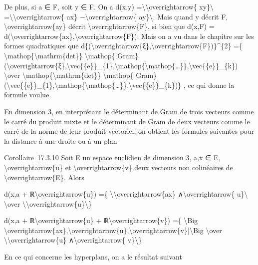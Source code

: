 \documentclass[]{article}
\begin{document}
De plus, si a ∈ F, soit y ∈ F. On a d(x,y)
=\textbackslash{}\textbar{}\textbackslash{}overrightarrow\{
xy\}\textbackslash{}\textbar{}
=\textbackslash{}\textbar{}\textbackslash{}overrightarrow\{ ax\}
−\textbackslash{}overrightarrow\{ ay\}\textbackslash{}\textbar{}. Mais
quand y décrit F, \textbackslash{}overrightarrow\{ay\} décrit
\textbackslash{}overrightarrow\{F\}, si bien que d(x,F) =
d(\textbackslash{}overrightarrow\{ax\},\textbackslash{}overrightarrow\{F\}).
Mais on a vu dans le chapitre sur les formes quadratiques que
d\{(\textbackslash{}overrightarrow\{ξ\},\textbackslash{}overrightarrow\{F\})\}\^{}\{2\}
=\{ \textbackslash{}mathop\{\textbackslash{}mathrm\{det\}\}
\textbackslash{}mathop\{
Gram\}(\textbackslash{}overrightarrow\{ξ\},\textbackslash{}vec\{\{e\}\}\_\{1\},\textbackslash{}mathop\{\textbackslash{}mathop\{\ldots{}\}\},\textbackslash{}vec\{\{e\}\}\_\{k\})
\textbackslash{}over
\textbackslash{}mathop\{\textbackslash{}mathrm\{det\}\}
\textbackslash{}mathop\{
Gram\}(\textbackslash{}vec\{\{e\}\}\_\{1\},\textbackslash{}mathop\{\textbackslash{}mathop\{\ldots{}\}\},\textbackslash{}vec\{\{e\}\}\_\{k\})\}
, ce qui donne la formule voulue.

En dimension 3, en interprétant le déterminant de Gram de trois vecteurs
comme le carré du produit mixte et le déterminant de Gram de deux
vecteurs comme le carré de la norme de leur produit vectoriel, on
obtient les formules suivantes pour la distance à une droite ou à un
plan

Corollaire~17.3.10 Soit E un espace euclidien de dimension 3, a,x ∈ E,
\textbackslash{}overrightarrow\{u\} et
\textbackslash{}overrightarrow\{v\} deux vecteurs non colinéaires de
\textbackslash{}overrightarrow\{E\}. Alors

d(x,a + ℝ\textbackslash{}overrightarrow\{u\}) =\{
\textbackslash{}\textbar{}\textbackslash{}overrightarrow\{ax\}
∧\textbackslash{}overrightarrow\{ u\}\textbackslash{}\textbar{}
\textbackslash{}over
\textbackslash{}\textbar{}\textbackslash{}overrightarrow\{u\}\textbackslash{}\textbar{}\}

d(x,a + ℝ\textbackslash{}overrightarrow\{u\} +
ℝ\textbackslash{}overrightarrow\{v\}) =\{ \textbackslash{}Big
\textbar{}{[}\textbackslash{}overrightarrow\{ax\},\textbackslash{}overrightarrow\{u\},\textbackslash{}overrightarrow\{v\}{]}\textbackslash{}Big
\textbar{} \textbackslash{}over
\textbackslash{}\textbar{}\textbackslash{}overrightarrow\{u\}
∧\textbackslash{}overrightarrow\{ v\}\textbackslash{}\textbar{}\}

En ce qui concerne les hyperplans, on a le résultat suivant
\end{document}
